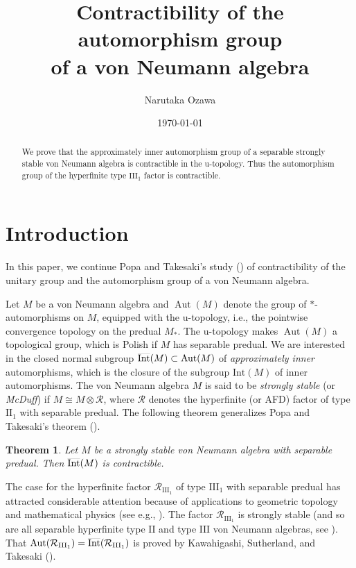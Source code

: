 \documentclass[12pt,nosumlimits,nonamelimits]{amsart}
\title[Contractibility of the automorphism group]{Contractibility 
of the automorphism group \\ of a von Neumann algebra}
\author{Narutaka Ozawa}
\date{\today}
\newtheorem{thmA}{Theorem}
\theoremstyle{remark}
\newcommand{\cR}{\mathcal{R}}
\DeclareMathOperator{\Aut}{Aut}
\DeclareMathOperator{\Int}{\smash{\overline{\mathrm{Int}}}}
\begin{document}
\begin{abstract}
We prove that the approximately inner automorphism group 
of a separable strongly stable von Neumann algebra 
is contractible in the u-topo\-logy. 
Thus the automorphism group of the hyperfinite type $\mathrm{III}_1$ 
factor is contractible. 
\end{abstract}
%
\maketitle
%
\section{Introduction}
%
In this paper, we continue Popa and Takesaki's 
study (\cite{pt}) of contractibility of the unitary group and 
the automorphism group of a von Neumann algebra. 

Let $M$ be a von Neumann algebra and $\Aut(M)$ denote 
the group of $*$-auto\-mor\-phisms on $M$, 
equipped with the u-topo\-logy, i.e., the pointwise 
convergence topology on the predual $M_*$. 
The u-topo\-logy makes $\Aut(M)$ a topological group, 
which is Polish if $M$ has separable predual. 
We are interested in the closed normal 
subgroup $\Int(M)\subset\Aut(M)$ 
of \emph{approximately inner} automorphisms, 
which is the closure of the subgroup 
$\mathrm{Int}(M)$ of inner automorphisms. 
The von Neumann algebra $M$ is said to 
be \emph{strongly stable} (or \emph{McDuff}) 
if $M\cong M\otimes\cR$, 
where $\cR$ denotes the hyperfinite (or AFD) factor 
of type $\mathrm{II}_1$ with separable predual. 
The following theorem generalizes Popa 
and Takesaki's theorem (\cite{pt}). 

\begin{thmA}\label{thmA}
Let $M$ be a strongly stable von Neumann algebra 
with separable predual. 
Then $\Int(M)$ is contractible. 
\end{thmA}

The case for the hyperfinite factor $\cR_{\mathrm{III}_1}$ 
of type $\mathrm{III}_1$ with separable predual 
has attracted considerable attention because 
of applications to geometric topology and 
mathematical physics (see e.g., \cite{st}). 
The factor $\cR_{\mathrm{III}_1}$ is strongly stable 
(and so are all separable hyperfinite type $\mathrm{II}$ 
and type $\mathrm{III}$ von Neumann algebras, 
see \cite{takesakiIII}). 
That $\Aut(\cR_{\mathrm{III}_1})=\Int(\cR_{\mathrm{III}_1})$ 
is proved by Kawahigashi, Sutherland, and Takesaki (\cite{kst}).
\end{document}
